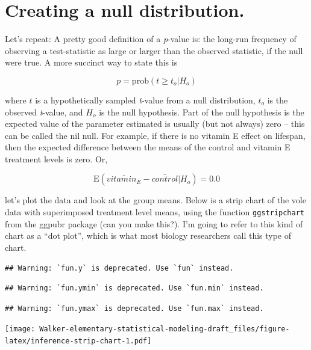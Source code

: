 \documentclass[]{book}
\begin{document}
\hypertarget{creating-a-null-distribution.}{%
\section{Creating a null distribution.}\label{creating-a-null-distribution.}}

Let's repeat: A pretty good definition of a \emph{p}-value is: the long-run frequency of observing a test-statistic as large or larger than the observed statistic, if the null were true. A more succinct way to state this is

\begin{equation}
p = \mathrm{prob}(t \ge t_o | H_o)
\end{equation}

where \(t\) is a hypothetically sampled \emph{t}-value from a null distribution, \(t_o\) is the observed \emph{t}-value, and \(H_o\) is the null hypothesis. Part of the null hypothesis is the expected value of the parameter estimated is usually (but not always) zero -- this can be called the nil null. For example, if there is no vitamin E effect on lifespan, then the expected difference between the means of the control and vitamin E treatment levels is zero. Or,

\begin{equation}
\mathrm{E}(\bar{vitamin_E} - \bar{control} | H_o) = 0.0
\end{equation}

let's plot the data and look at the group means. Below is a strip chart of the vole data with superimposed treatment level means, using the function \texttt{ggstripchart} from the ggpubr package (can you make this?). I'm going to refer to this kind of chart as a ``dot plot'', which is what most biology researchers call this type of chart.

\begin{verbatim}
## Warning: `fun.y` is deprecated. Use `fun` instead.
\end{verbatim}

\begin{verbatim}
## Warning: `fun.ymin` is deprecated. Use `fun.min` instead.
\end{verbatim}

\begin{verbatim}
## Warning: `fun.ymax` is deprecated. Use `fun.max` instead.
\end{verbatim}

\texttt{[image: Walker-elementary-statistical-modeling-draft\_files/figure-latex/inference-strip-chart-1.pdf]}
\end{document}
